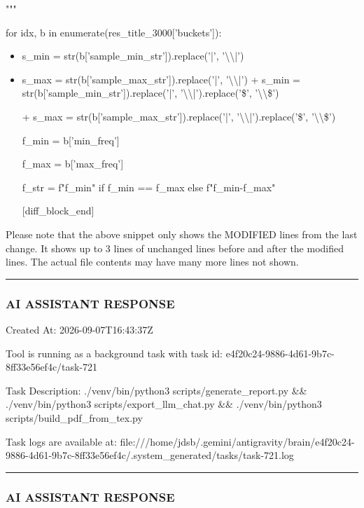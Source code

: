 \documentclass[11pt,a4paper]{article}
\begin{document}
"""

for idx, b in enumerate(res\_title\_3000['buckets']):

\begin{itemize}
\item        s\_min = str(b['sample\_min\_str']).replace('|', '\textbackslash{}\textbackslash{}|')
\item        s\_max = str(b['sample\_max\_str']).replace('|', '\textbackslash{}\textbackslash{}|')
+        s\_min = str(b['sample\_min\_str']).replace('|', '\textbackslash{}\textbackslash{}|').replace('\$', '\textbackslash{}\textbackslash{}\$')

+        s\_max = str(b['sample\_max\_str']).replace('|', '\textbackslash{}\textbackslash{}|').replace('\$', '\textbackslash{}\textbackslash{}\$')

f\_min = b['min\_freq']

f\_max = b['max\_freq']

f\_str = f"{f\_min}" if f\_min == f\_max else f"{f\_min}-{f\_max}"

[diff\_block\_end]

\end{itemize}

Please note that the above snippet only shows the MODIFIED lines from the last change. It shows up to 3 lines of unchanged lines before and after the modified lines. The actual file contents may have many more lines not shown.


\hrule

\subsubsection{AI ASSISTANT RESPONSE}

Created At: 2026-09-07T16:43:37Z

Tool is running as a background task with task id: e4f20c24-9886-4d61-9b7c-8ff33e56ef4c/task-721

Task Description: ./venv/bin/python3 scripts/generate\_report.py \&\& ./venv/bin/python3 scripts/export\_llm\_chat.py \&\& ./venv/bin/python3 scripts/build\_pdf\_from\_tex.py

Task logs are available at: file:///home/jdsb/.gemini/antigravity/brain/e4f20c24-9886-4d61-9b7c-8ff33e56ef4c/.system\_generated/tasks/task-721.log


\hrule

\subsubsection{AI ASSISTANT RESPONSE}
\end{document}
